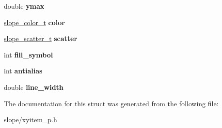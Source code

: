 \begin{DoxyCompactItemize}
\item 
\hypertarget{struct__slope__xyitem_a59b258bcde73db7e1246b2258fcb4cf4}{double {\bfseries ymax}}\label{struct__slope__xyitem_a59b258bcde73db7e1246b2258fcb4cf4}

\item 
\hypertarget{struct__slope__xyitem_a15d5849f6c2fea2fac75d483eabe198a}{\hyperlink{struct__slope__color}{slope\+\_\+color\+\_\+t} {\bfseries color}}\label{struct__slope__xyitem_a15d5849f6c2fea2fac75d483eabe198a}

\item 
\hypertarget{struct__slope__xyitem_afbec1ee0523a97e576b2a369d909c888}{\hyperlink{group__Item_ga7be66725a3a198bcbd9434e6d3ad70c5}{slope\+\_\+scatter\+\_\+t} {\bfseries scatter}}\label{struct__slope__xyitem_afbec1ee0523a97e576b2a369d909c888}

\item 
\hypertarget{struct__slope__xyitem_aa4f942a3bc1907d54158df9912cbfed6}{int {\bfseries fill\+\_\+symbol}}\label{struct__slope__xyitem_aa4f942a3bc1907d54158df9912cbfed6}

\item 
\hypertarget{struct__slope__xyitem_a809b4363b4fae543e0196983bcc99bd4}{int {\bfseries antialias}}\label{struct__slope__xyitem_a809b4363b4fae543e0196983bcc99bd4}

\item 
\hypertarget{struct__slope__xyitem_afa9758ee875e6c37ed250eb0d6cc4d4b}{double {\bfseries line\+\_\+width}}\label{struct__slope__xyitem_afa9758ee875e6c37ed250eb0d6cc4d4b}

\end{DoxyCompactItemize}


The documentation for this struct was generated from the following file\+:\begin{DoxyCompactItemize}
\item 
slope/xyitem\+\_\+p.\+h\end{DoxyCompactItemize}
